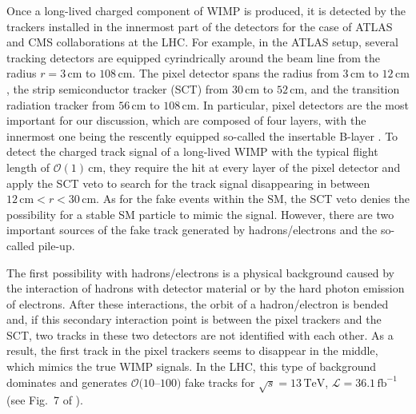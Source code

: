 \documentclass[12pt,twoside,book]{article}
\begin{document}
Once a long-lived charged component of WIMP is produced, it is detected by the trackers installed in the innermost part of the detectors for the case of ATLAS and CMS collaborations at the LHC.
For example, in the ATLAS setup, several tracking detectors are equipped cyrindrically around the beam line from the radius $r = 3\,\mathrm{cm}$ to $108\,\mathrm{cm}$.
The pixel detector spans the radius from $3\,\mathrm{cm}$ to $12\,\mathrm{cm}$, the strip semiconductor tracker (SCT) from $30\,\mathrm{cm}$ to $52\,\mathrm{cm}$, and the transition radiation tracker from $56\,\mathrm{cm}$ to $108\,\mathrm{cm}$.
In particular, pixel detectors are the most important for our discussion, which are composed of four layers, with the innermost one being the rescently equipped so-called the insertable B-layer \cite{Capeans:1291633, CERN-LHCC-2012-009, Abbott:2018ikt}.
To detect the charged track signal of a long-lived WIMP with the typical flight length of $\mathcal{O} (1)\, \mathrm{cm}$, they require the hit at every layer of the pixel detector and apply the SCT veto to search for the track signal disappearing in between $12\,\mathrm{cm} < r < 30\,\mathrm{cm}$.
As for the fake events within the SM, the SCT veto denies the possibility for a stable SM particle to mimic the signal.
However, there are two important sources of the fake track generated by hadrons/electrons and the so-called pile-up.

The first possibility with hadrons/electrons is a physical background caused by the interaction of hadrons with detector material or by the hard photon emission of electrons.
After these interactions, the orbit of a hadron/electron is bended and, if this secondary interaction point is between the pixel trackers and the SCT, two tracks in these two detectors are not identified with each other.
As a result, the first track in the pixel trackers seems to disappear in the middle, which mimics the true WIMP signals.
In the LHC, this type of background dominates and generates $\mathcal{O}(10$--$100)$ fake tracks for $\sqrt{s}=13\,\mathrm{TeV}$, $\mathcal{L} = 36.1\,\mathrm{fb}^{-1}$ (see Fig.~7 of \cite{Aaboud:2017mpt}).
\end{document}
